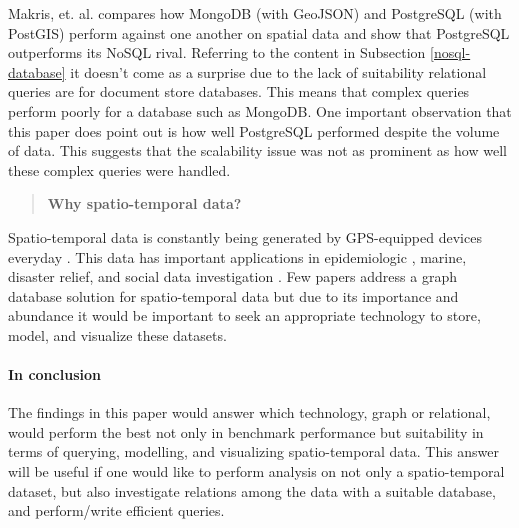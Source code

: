 Makris, et. al. \cite{mongovspostgres} compares how MongoDB (with GeoJSON) and PostgreSQL (with PostGIS) perform against one another on spatial data and show that PostgreSQL outperforms its NoSQL rival. Referring to the content in Subsection \ref{nosql-database} it doesn't come as a surprise due to the lack of suitability relational queries are for document store databases. This means that complex queries perform poorly for a database such as MongoDB. One important observation that this paper does point out is how well PostgreSQL performed despite the volume of data. This suggests that the scalability issue was not as prominent as how well these complex queries were handled.

\begin{quote}
    \textbf{Why spatio-temporal data?}
\end{quote}

Spatio-temporal data is constantly being generated by GPS-equipped devices everyday \cite{twitterdata}\cite{clost}. This data has important applications in epidemiologic \cite{spatiotemporal-epidemiology}, marine, disaster relief, and social data investigation \cite{rao2012spatiotemporal}. Few papers address a graph database solution for spatio-temporal data but due to its importance and abundance it would be important to seek an appropriate technology to store, model, and visualize these datasets.

\paragraph{In conclusion} The findings in this paper would answer which technology, graph or relational, would perform the best not only in benchmark performance but suitability in terms of querying, modelling, and visualizing spatio-temporal data. This answer will be useful if one would like to perform analysis on not only a spatio-temporal dataset, but also investigate relations among the data with a suitable database, and perform/write efficient queries.